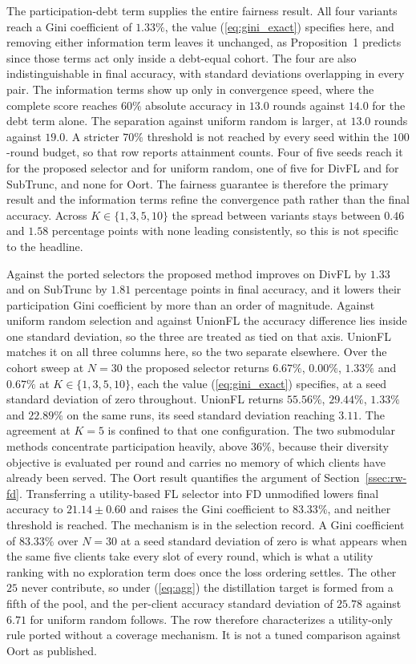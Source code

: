 \documentclass[journal]{IEEEtran}
\newcommand{\rev}[1]{#1}
\begin{document}
\rev{The participation-debt term supplies the entire fairness result. All four variants reach a Gini coefficient of $1.33\%$, the value (\ref{eq:gini_exact}) specifies here, and removing either information term leaves it unchanged, as Proposition~1 predicts since those terms act only inside a debt-equal cohort. The four are also indistinguishable in final accuracy, with standard deviations overlapping in every pair. The information terms show up only in convergence speed, where the complete score reaches $60\%$ absolute accuracy in $13.0$ rounds against $14.0$ for the debt term alone. The separation against uniform random is larger, at $13.0$ rounds against $19.0$. A stricter $70\%$ threshold is not reached by every seed within the $100$-round budget, so that row reports attainment counts. Four of five seeds reach it for the proposed selector and for uniform random, one of five for DivFL and for SubTrunc, and none for Oort. The fairness guarantee is therefore the primary result and the information terms refine the convergence path rather than the final accuracy. Across $K \in \{1, 3, 5, 10\}$ the spread between variants stays between $0.46$ and $1.58$ percentage points with none leading consistently, so this is not specific to the headline.}

\rev{Against the ported selectors the proposed method improves on DivFL by $1.33$ and on SubTrunc by $1.81$ percentage points in final accuracy, and it lowers their participation Gini coefficient by more than an order of magnitude. Against uniform random selection and against UnionFL the accuracy difference lies inside one standard deviation, so the three are treated as tied on that axis. UnionFL matches it on all three columns here, so the two separate elsewhere. Over the cohort sweep at $N=30$ the proposed selector returns $6.67\%$, $0.00\%$, $1.33\%$ and $0.67\%$ at $K \in \{1,3,5,10\}$, each the value (\ref{eq:gini_exact}) specifies, at a seed standard deviation of zero throughout. UnionFL returns $55.56\%$, $29.44\%$, $1.33\%$ and $22.89\%$ on the same runs, its seed standard deviation reaching $3.11$. The agreement at $K=5$ is confined to that one configuration. The two submodular methods concentrate participation heavily, above $36\%$, because their diversity objective is evaluated per round and carries no memory of which clients have already been served. The Oort result quantifies the argument of Section~\ref{ssec:rw-fd}. Transferring a utility-based FL selector into FD unmodified lowers final accuracy to $21.14 \pm 0.60$ and raises the Gini coefficient to $83.33\%$, and neither threshold is reached. The mechanism is in the selection record. A Gini coefficient of $83.33\%$ over $N=30$ at a seed standard deviation of zero is what appears when the same five clients take every slot of every round, which is what a utility ranking with no exploration term does once the loss ordering settles. The other $25$ never contribute, so under (\ref{eq:agg}) the distillation target is formed from a fifth of the pool, and the per-client accuracy standard deviation of $25.78$ against $6.71$ for uniform random follows. The row therefore characterizes a utility-only rule ported without a coverage mechanism. It is not a tuned comparison against Oort as published.}
\end{document}
